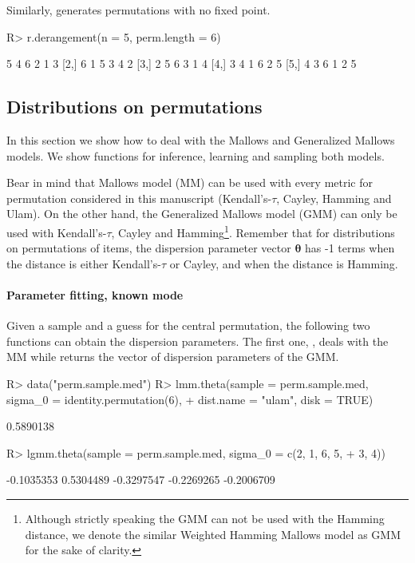 \documentclass[article,nojss]{jss}
\begin{document}
Similarly,  generates  permutations with no fixed point. 
\begin{Schunk}
\begin{Sinput}
R> r.derangement(n = 5, perm.length = 6)
\end{Sinput}
\begin{Soutput}
     [,1] [,2] [,3] [,4] [,5] [,6]
[1,]    5    4    6    2    1    3
[2,]    6    1    5    3    4    2
[3,]    2    5    6    3    1    4
[4,]    3    4    1    6    2    5
[5,]    4    3    6    1    2    5
\end{Soutput}
\end{Schunk}
\subsection{Distributions on permutations}
In this section we show how to deal with the Mallows and Generalized Mallows models. We show functions for inference, learning and sampling both models.

Bear in mind that Mallows model (MM) can be used with every metric for permutation considered in this manuscript (Kendall's-$\tau$, Cayley, Hamming and Ulam). On the other hand, the Generalized Mallows model (GMM) can only be used with Kendall's-$\tau$, Cayley and Hamming\footnote{Although strictly speaking the GMM can not be used with the Hamming distance, we denote the similar Weighted Hamming Mallows model as GMM for the sake of clarity.}. Remember that for distributions on permutations of  items, the dispersion parameter vector $\boldsymbol \theta$ has -1 terms when the distance is either Kendall's-$\tau$ or Cayley, and  when the distance is Hamming.

\paragraph*{Parameter fitting, known mode}
Given a sample and a guess for the central permutation, the following two functions can obtain the dispersion parameters. The first one, , deals with the MM while  returns the vector of dispersion parameters of the GMM. 
\begin{Schunk}
\begin{Sinput}
R> data("perm.sample.med")
R> lmm.theta(sample = perm.sample.med, sigma_0 = identity.permutation(6), 
+     dist.name = "ulam", disk = TRUE)
\end{Sinput}
\begin{Soutput}
[1] 0.5890138
\end{Soutput}
\begin{Sinput}
R> lgmm.theta(sample = perm.sample.med, sigma_0 = c(2, 1, 6, 5, 
+     3, 4))
\end{Sinput}
\begin{Soutput}
[1] -0.1035353  0.5304489 -0.3297547 -0.2269265 -0.2006709
\end{Soutput}
\end{Schunk}
\end{document}
